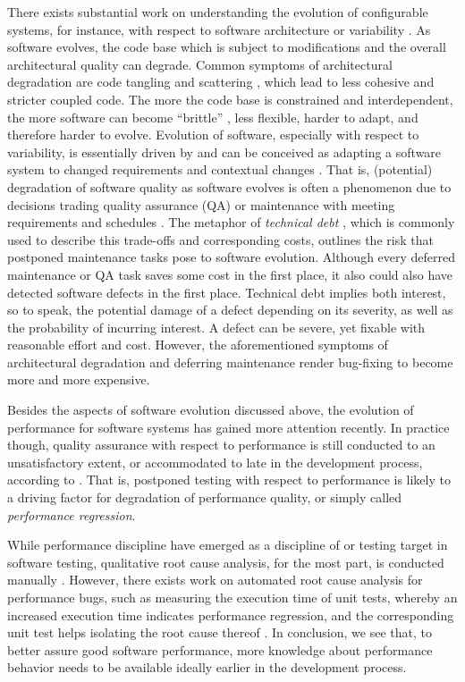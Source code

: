 There exists substantial work on understanding the evolution of configurable
systems, for instance, with respect to software architecture \citep{zhang_variability_2013,passos_feature_2015} or variability
\citep{seidl_co-evolution_2012,peng_analyzing_2011,passos_towards_2012}. As
software evolves, the code base which is subject to modifications and the overall architectural quality can degrade. Common symptoms of architectural degradation are code tangling and scattering
\citep{zhang_variability_2013,passos_feature_2015}, which lead to
less cohesive and stricter coupled code. The more the code base is constrained and interdependent, the more software can become ``brittle''
\citep{perry_software_1991} , less flexible, harder to adapt, and therefore harder to evolve.
Evolution of software, especially with respect to variability, is essentially
driven by and can be conceived as adapting a software system to changed
requirements and contextual changes \citep{peng_analyzing_2011}. That is,
(potential) degradation of software quality as software evolves is often a phenomenon due
to decisions trading quality assurance (QA) or maintenance with meeting
requirements and schedules \citep{guo_tracking_2011}. The metaphor of
\emph{technical debt} \citep{guo_tracking_2011}, which is commonly used to
describe this trade-offs and corresponding costs, outlines the risk that postponed maintenance tasks pose to
software evolution. Although every deferred maintenance or QA task saves some
cost in the first place, it also could also have detected software defects in
the first place. Technical debt implies both interest, so to speak, the
potential damage of a defect depending on its severity, as well as the
probability of incurring interest. A defect can be severe, yet fixable with
reasonable effort and cost. However, the aforementioned symptoms of
architectural degradation and deferring maintenance render bug-fixing to become
more and more expensive.

Besides the aspects of software evolution discussed above, the evolution of
performance for software systems has gained more attention recently. In
practice though, quality assurance with respect to performance is still
conducted to an unsatisfactory extent, or accommodated to late in the
development process, according to \cite{molyneaux_art_2014}. That is, postponed testing
with respect to performance is likely to a driving factor for degradation of
performance quality, or simply called \emph{performance regression}.

While performance discipline have emerged as a discipline of or testing target
in software testing, qualitative root cause analysis, for the most part, is
conducted manually \citep{molyneaux_art_2014}. However,  there exists work on
automated root cause analysis for performance bugs, such as measuring the execution time
of unit tests, whereby an increased execution time indicates performance
regression, and the corresponding unit test helps isolating the root cause
thereof \citep{heger_automated_2013,nguyen_industrial_2014}. In conclusion, we
see that, to better assure good software performance, more knowledge about performance behavior needs to be
available ideally earlier in the development process.

